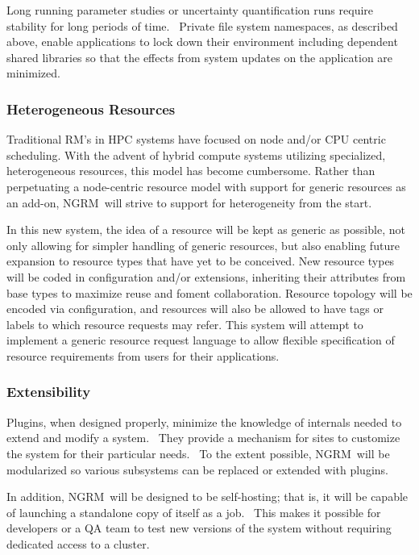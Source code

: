 \documentclass{article}
\newcommand{\ngrm}{NGRM}
\begin{document}
Long running parameter studies or uncertainty quantification runs
require stability for long periods of time.  Private file system
namespaces, as described above, enable applications to lock down their
environment including dependent shared libraries so that the effects from
system updates on the application are minimized.

\subsubsection{Heterogeneous Resources}

Traditional RM's in HPC systems have focused on node and/or CPU centric
scheduling. With the advent of hybrid compute systems utilizing specialized,
heterogeneous resources, this model has become cumbersome. Rather than
perpetuating a node-centric resource model with support for generic
resources as an add-on, \ngrm\ will strive to support for heterogeneity
from the start.

In this new system, the idea of a resource will be kept as generic as
possible, not only allowing for simpler handling of generic resources,
but also enabling future expansion to resource types that have yet to
be conceived. New resource types will be coded in configuration and/or
extensions, inheriting their attributes from base types to maximize reuse
and foment collaboration.  Resource topology will be encoded via
configuration, and resources will also be allowed to have tags or labels
to which resource requests may refer. This system will attempt to
implement a generic resource request language to allow flexible
specification of resource requirements from users for their applications.

\subsubsection{Extensibility}

Plugins, when designed properly, minimize the knowledge of internals
needed to extend and modify a system.  They provide a mechanism for
sites to customize the system for their particular needs.  To the extent
possible, \ngrm\ will be modularized so various subsystems can be replaced
or extended with plugins.

In addition, \ngrm\ will be designed to be self-hosting; that is, it will
be capable of launching a standalone copy of itself as a job.  This makes
it possible for developers or a QA team to test new versions of the
system without requiring dedicated access to a cluster.
\end{document}
